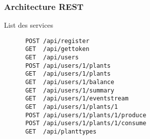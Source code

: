 
\begin{frame}[fragile]
\frametitle{Architecture REST}
  \begin{block}{List des services}
    \begin{lstlisting}
      POST /api/register
      GET  /api/gettoken 
      GET  /api/users
      POST /api/users/1/plants
      GET  /api/users/1/plants
      GET  /api/users/1/balance
      GET  /api/users/1/summary
      GET  /api/users/1/eventstream
      GET  /api/users/1/plants/1
      POST /api/users/1/plants/1/produce
      POST /api/users/1/plants/1/consume
      GET  /api/planttypes
      \end{lstlisting}
  \end{block}  
\end{frame}

